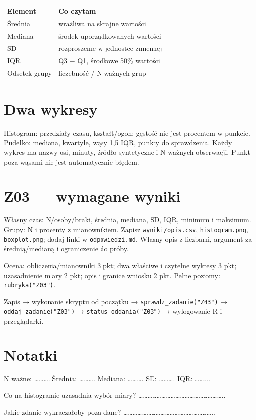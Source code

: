 \documentclass[
  polish,
  11pt,
  a4paper,
]{article}
\newcounter{none} %
\begin{document}
{\def\LTcaptype{none} %
\begin{longtable}[]{@{}ll@{}}
\toprule\noalign{}
Element & Co czytam \\
\midrule\noalign{}
\endhead
\bottomrule\noalign{}
\endlastfoot
Średnia & wrażliwa na skrajne wartości \\
Mediana & środek uporządkowanych wartości \\
SD & rozproszenie w jednostce zmiennej \\
IQR & Q3 − Q1, środkowe 50\% wartości \\
Odsetek grupy & liczebność / N ważnych grup \\
\end{longtable}
}

\section{Dwa wykresy}\label{dwa-wykresy}

Histogram: przedziały czasu, kształt/ogon; gęstość nie jest procentem w
punkcie. Pudełko: mediana, kwartyle, wąsy 1,5 IQR, punkty do
sprawdzenia. Każdy wykres ma nazwy osi, minuty, źródło syntetyczne i N
ważnych obserwacji. Punkt poza wąsami nie jest automatycznie błędem.

\section{Z03 --- wymagane wyniki}\label{z03-wymagane-wyniki}

Własny czas: N/osoby/braki, średnia, mediana, SD, IQR, minimum i
maksimum. Grupy: N i procenty z mianownikiem. Zapisz
\texttt{wyniki/opis.csv}, \texttt{histogram.png}, \texttt{boxplot.png};
dodaj linki w \texttt{odpowiedzi.md}. Własny opis z liczbami, argument
za średnią/medianą i ograniczenie do próby.

Ocena: obliczenia/mianowniki 3 pkt; dwa właściwe i czytelne wykresy 3
pkt; uzasadnienie miary 2 pkt; opis i granice wniosku 2 pkt. Pełne
poziomy: \texttt{rubryka("Z03")}.

Zapis → wykonanie skryptu od początku → \texttt{sprawdz\_zadanie("Z03")}
→ \texttt{oddaj\_zadanie("Z03")} → \texttt{status\_oddania("Z03")} →
wylogowanie R i przeglądarki.

\section{Notatki}\label{notatki}

N ważne: \ldots\ldots\ldots. Średnia: \ldots\ldots\ldots. Mediana:
\ldots\ldots\ldots. SD: \ldots\ldots\ldots. IQR: \ldots\ldots\ldots.

Co na histogramie uzasadnia wybór miary?
\ldots\ldots\ldots\ldots\ldots\ldots\ldots\ldots\ldots\ldots\ldots\ldots\ldots\ldots\ldots\ldots\ldots\ldots..

Jakie zdanie wykraczałoby poza dane?
\ldots\ldots\ldots\ldots\ldots\ldots\ldots\ldots\ldots\ldots\ldots\ldots\ldots\ldots\ldots\ldots\ldots\ldots\ldots..
\end{document}
